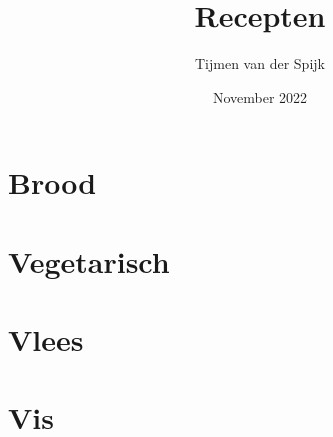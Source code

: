 \documentclass[12pt]{article}
\title{Recepten}
\author{Tijmen van der Spijk}
\date{November 2022}
\begin{document}
\maketitle
\tableofcontents
\pagebreak

\section{Brood}

\section{Vegetarisch}

\pagebreak

\pagebreak

\pagebreak

\section{Vlees}

\pagebreak

\section{Vis}

\pagebreak
\end{document}
